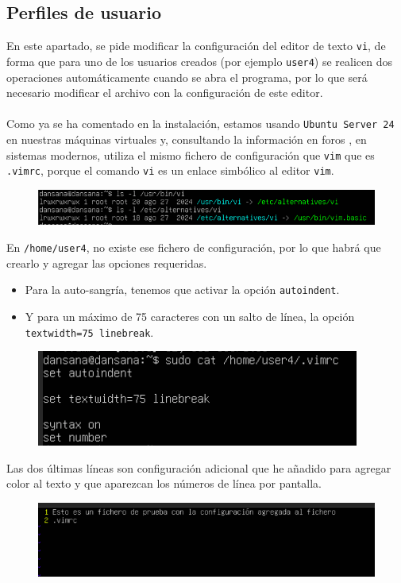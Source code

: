 \documentclass[10pt]{article}
\begin{document}
	\subsection{Perfiles de usuario}
	En este apartado, se pide modificar la configuración del editor de texto \verb|vi|, de forma que para uno de los usuarios creados (por ejemplo \verb|user4|) se realicen dos operaciones automáticamente cuando se abra el programa, por lo que será necesario modificar el archivo con la configuración de este editor.\\\\
	Como ya se ha comentado en la instalación, estamos usando \verb|Ubuntu Server 24| en nuestras máquinas virtuales y, consultando la información en foros \cite{rcfile}, en sistemas modernos, utiliza el mismo fichero de configuración que \verb|vim| que es \verb|.vimrc|, porque el comando \verb|vi| es un enlace simbólico al editor \verb|vim|.
	\begin{figure}[H]
		\setlength{\abovecaptionskip}{0cm}
		\setlength{\belowcaptionskip}{0cm}
		\centering
		\includegraphics[width=0.8\linewidth]{Recursos/viVim.png}
	\end{figure}
	En \verb|/home/user4|, no existe ese fichero de configuración, por lo que habrá que crearlo y agregar las opciones requeridas.
	\begin{itemize}
		\item Para la auto-sangría, tenemos que activar la opción \verb|autoindent|.
		\item Y para un máximo de 75 caracteres con un salto de línea, la opción \verb|textwidth=75 linebreak|.
	\end{itemize}
	\begin{figure}[H]
		\setlength{\abovecaptionskip}{0cm}
		\setlength{\belowcaptionskip}{0cm}
		\centering
		\includegraphics[width=0.8\linewidth]{Recursos/vimrc.png}
	\end{figure}
	Las dos últimas líneas son configuración adicional que he añadido para agregar color al texto y que aparezcan los números de línea por pantalla.
	\begin{figure}[H]
		\setlength{\abovecaptionskip}{0cm}
		\setlength{\belowcaptionskip}{0cm}
		\centering
		\includegraphics[width=0.8\linewidth]{Recursos/pruebaVi.png}
	\end{figure}
	\clearpage
	
\end{document}
